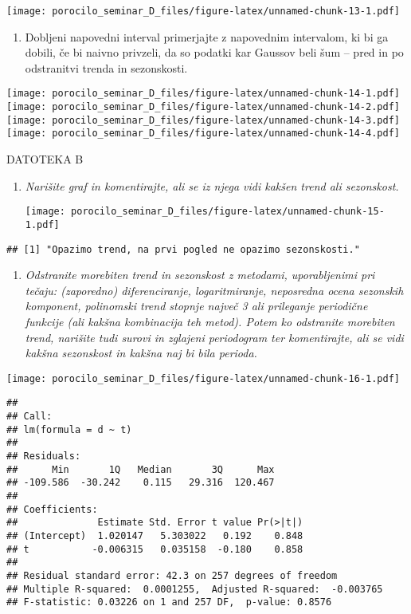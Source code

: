 \documentclass[
]{article}
\providecommand{\tightlist}{%
  \setlength{\itemsep}{0pt}\setlength{\parskip}{0pt}}
\begin{document}
\texttt{[image: porocilo\_seminar\_D\_files/figure-latex/unnamed-chunk-13-1.pdf]}

\begin{enumerate}
\def\labelenumi{\arabic{enumi}.}
\setcounter{enumi}{8}
\tightlist
\item
  Dobljeni napovedni interval primerjajte z napovednim intervalom, ki bi
  ga dobili, če bi naivno privzeli, da so podatki kar Gaussov beli šum
  -- pred in po odstranitvi trenda in sezonskosti.
\end{enumerate}

\texttt{[image: porocilo\_seminar\_D\_files/figure-latex/unnamed-chunk-14-1.pdf]}
\texttt{[image: porocilo\_seminar\_D\_files/figure-latex/unnamed-chunk-14-2.pdf]}
\texttt{[image: porocilo\_seminar\_D\_files/figure-latex/unnamed-chunk-14-3.pdf]}
\texttt{[image: porocilo\_seminar\_D\_files/figure-latex/unnamed-chunk-14-4.pdf]}

DATOTEKA B

\begin{enumerate}
\def\labelenumi{\arabic{enumi}.}
\tightlist
\item
  \emph{Narišite graf in komentirajte, ali se iz njega vidi kakšen trend
  ali sezonskost.}

  \texttt{[image: porocilo\_seminar\_D\_files/figure-latex/unnamed-chunk-15-1.pdf]}
\end{enumerate}

\begin{verbatim}
## [1] "Opazimo trend, na prvi pogled ne opazimo sezonskosti."
\end{verbatim}

\begin{enumerate}
\def\labelenumi{\arabic{enumi}.}
\setcounter{enumi}{1}
\tightlist
\item
  \emph{Odstranite morebiten trend in sezonskost z metodami,
  uporabljenimi pri tečaju: (zaporedno) diferenciranje, logaritmiranje,
  neposredna ocena sezonskih komponent, polinomski trend stopnje največ
  3 ali prileganje periodične funkcije (ali kakšna kombinacija teh
  metod). Potem ko odstranite morebiten trend, narišite tudi surovi in
  zglajeni periodogram ter komentirajte, ali se vidi kakšna sezonskost
  in kakšna naj bi bila perioda.}
\end{enumerate}

\texttt{[image: porocilo\_seminar\_D\_files/figure-latex/unnamed-chunk-16-1.pdf]}

\begin{verbatim}
## 
## Call:
## lm(formula = d ~ t)
## 
## Residuals:
##      Min       1Q   Median       3Q      Max 
## -109.586  -30.242    0.115   29.316  120.467 
## 
## Coefficients:
##              Estimate Std. Error t value Pr(>|t|)
## (Intercept)  1.020147   5.303022   0.192    0.848
## t           -0.006315   0.035158  -0.180    0.858
## 
## Residual standard error: 42.3 on 257 degrees of freedom
## Multiple R-squared:  0.0001255,  Adjusted R-squared:  -0.003765 
## F-statistic: 0.03226 on 1 and 257 DF,  p-value: 0.8576
\end{verbatim}
\end{document}
